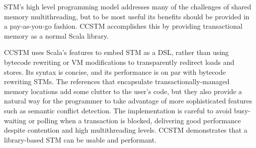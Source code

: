 
STM's high level programming model addresses many of the challenges of
shared memory multithreading, but to be most useful its benefits should
be provided in a pay-as-you-go fashion.  CCSTM accomplishes this by
providing transactional memory as a normal Scala library.

CCSTM uses Scala's features to embed STM as a DSL, rather than using
bytecode rewriting or VM modifications to transparently redirect loads and
stores.  Its syntax is concise, and its performance is on par
with bytecode rewriting STMs.  The references that encapsulate
transactionally-managed memory locations add some clutter to the user's
code, but they also provide a natural way for the programmer to take
advantage of more sophisticated features such as semantic conflict
detection.  The implementation is careful to avoid busy-waiting or
polling when a transaction is blocked, delivering good performance
despite contention and high multithreading levels.  CCSTM demonstrates
that a library-based STM can be usable and performant.

